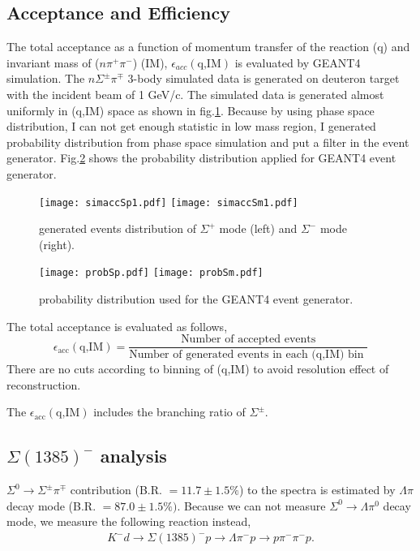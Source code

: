 \subsection{Acceptance and Efficiency}
The total acceptance as a function of momentum transfer of the reaction (q) and invariant mass of ($n\pi^+\pi^-$) (IM), $\epsilon_{acc}(\mbox{q,IM})$ is evaluated by GEANT4 simulation.
The $n\Sigma^{\pm}\pi^{\mp}$ 3-body simulated data is generated on deuteron target with the incident beam of 1 GeV/c.
The simulated data is generated almost uniformly in (q,IM) space as shown in fig.\ref{fig:genSpSm}. 
Because by using phase space distribution, I can not get enough statistic in low mass region, I generated probability distribution from phase space simulation and put a filter in the event generator. 
Fig.\ref{fig:probSpSm} shows the probability distribution applied for GEANT4 event generator.

\begin{figure}
\texttt{[image: simaccSp1.pdf]}
\texttt{[image: simaccSm1.pdf]}\label{fig:genSpSm}
\caption{generated events distribution of $\Sigma^+$ mode (left) and $\Sigma^-$ mode (right).}
\end{figure}

\begin{figure}
\texttt{[image: probSp.pdf]}
\texttt{[image: probSm.pdf]}\label{fig:probSpSm}
\caption{probability distribution used for the GEANT4 event generator.}
\end{figure}



The total acceptance is evaluated as follows,
\[
\epsilon_{\mbox{acc}}(\mbox{q,IM}) = \frac{\mbox{Number of accepted events}}{\mbox{Number of generated events in each (q,IM) bin }}
\]
There are no cuts according to binning of (q,IM) to avoid resolution effect of reconstruction.

The $\epsilon_{\mbox{acc}}(\mbox{q,IM})$ includes the branching ratio of $\Sigma^{\pm}$. 



\subsection{$\Sigma(1385)^{-}$ analysis}
$\Sigma^0 \rightarrow \Sigma^\pm\pi^\mp$ contribution (B.R. $=11.7 \pm 1.5 \%$) to the spectra is estimated by $\Lambda \pi$ decay mode (B.R. $=87.0 \pm 1.5 \%)$.
Because we can not measure $\Sigma^0 \rightarrow \Lambda \pi^0$ decay mode, we measure the following reaction instead,
\begin{eqnarray}
 K^-d \rightarrow \Sigma(1385)^-p \rightarrow \Lambda \pi^- p \rightarrow p\pi^-\pi^-p.
\end{eqnarray}
